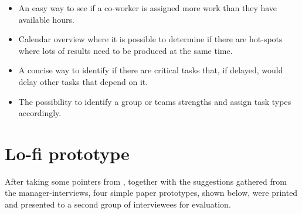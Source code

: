 \documentclass[nofilelist,dvipsnames]{cslthse-msc}
\begin{document}
      \begin{itemize}
        \item{
          An easy way to see if a co-worker is assigned more work than they
          have available hours.
        }
        \item{
          Calendar overview where it is possible to determine if there are
          hot-spots where lots of results need to be produced at the same
          time.
        }
        \item{
          A concise way to identify if there are critical tasks that, if
          delayed, would delay other tasks that depend on it.
        }
        \item{
          The possibility to identify a group or teams strengths and assign
          task types accordingly.
        }
      \end{itemize}

		\section{Lo-fi prototype}

      After taking some pointers from \findref, together with the suggestions
      gathered from the manager-interviews, four simple paper prototypes, shown
      below, were printed and presented to a second group of interviewees for
      evaluation.
\end{document}
